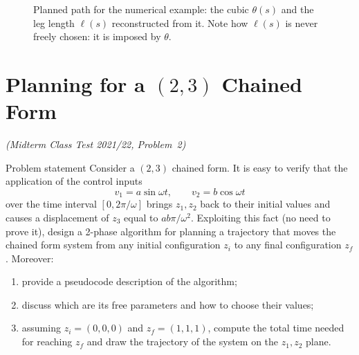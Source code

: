 \documentclass[11pt,a4paper]{article}
\def\boldsymbol#1{#1}%
\newcommand{\z}{\boldsymbol{z}}
\theoremstyle{definition}
\theoremstyle{plain}
\theoremstyle{remark}
\begin{document}
\begin{figure}[H]
\centering
{}\hfill
{}
\caption{Planned path for the numerical example: the cubic $\theta(s)$ and the leg length $\ell(s)$ reconstructed from it. Note how $\ell(s)$ is never freely chosen: it is imposed by $\theta$.}
\end{figure}

\section{Planning for a $(2,3)$ Chained Form}
\label{sec:chained}
\emph{(Midterm Class Test 2021/22, Problem~2)}

\begin{problem}{Problem statement}
Consider a $(2,3)$ chained form. It is easy to verify that the application of the control inputs
\[
  v_1=a\sin\omega t,\qquad v_2=b\cos\omega t
\]
over the time interval $[0,2\pi/\omega]$ brings $z_1,z_2$ back to their initial values and causes a displacement of $z_3$ equal to $ab\pi/\omega^2$. Exploiting this fact (no need to prove it), design a 2-phase algorithm for planning a trajectory that moves the chained form system from any initial configuration $\z_i$ to any final configuration $\z_f$. Moreover:
\begin{enumerate}[label=(\alph*),nosep]
  \item provide a pseudocode description of the algorithm;
  \item discuss which are its free parameters and how to choose their values;
  \item assuming $\z_i=(0,0,0)$ and $\z_f=(1,1,1)$, compute the total time needed for reaching $\z_f$ and draw the trajectory of the system on the $z_1,z_2$ plane.
\end{enumerate}
\end{problem}
\end{document}
